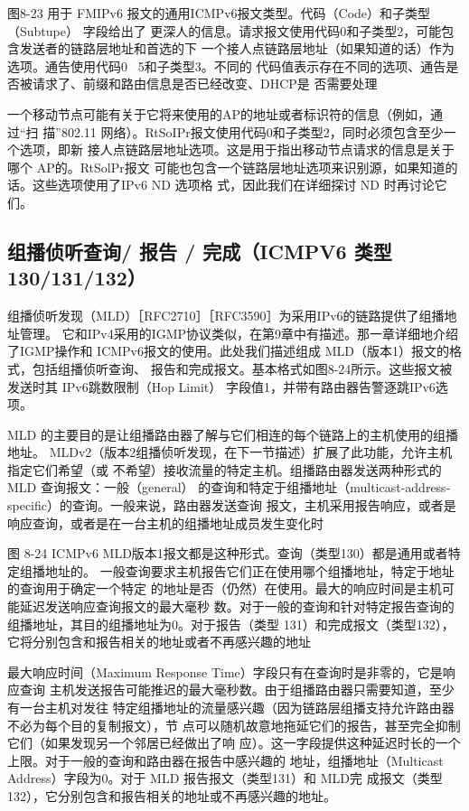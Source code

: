图8-23 用于 FMIPv6 报文的通用ICMPv6报文类型。代码（Code）和子类型（Subtupe） 字段给出了
更深人的信息。请求报文使用代码0和子类型2，可能包含发送者的链路层地址和首选的下
一个接人点链路层地址（如果知道的话）作为选项。通告使用代码0~ 5和子类型3。不同的
代码值表示存在不同的选项、通告是否被请求了、前缀和路由信息是否已经改变、DHCP是
否需要处理

一个移动节点可能有关于它将来使用的AP的地址或者标识符的信息（例如，通过“扫
描”802.11 网络）。RtSoIPr报文使用代码0和子类型2，同时必须包含至少一个选项，即新
接人点链路层地址选项。这是用于指出移动节点请求的信息是关于哪个 AP的。RtSolPr报文
可能也包含一个链路层地址选项来识别源，如果知道的话。这些选项使用了IPv6 ND 选项格
式，因此我们在详细探讨 ND 时再讨论它们。

\subsection{组播侦听查询/ 报告 / 完成（ICMPV6 类型 130/131/132）}
组播侦听发现（MLD）［RFC2710］［RFC3590］为采用IPv6的链路提供了组播地址管理。
它和IPv4采用的IGMP协议类似，在第9章中有描述。那一章详细地介绍了IGMP操作和
ICMPv6报文的使用。此处我们描述组成 MLD（版本1）报文的格式，包括组播侦听查询、
报告和完成报文。基本格式如图8-24所示。这些报文被发送时其 IPv6跳数限制（Hop Limit）
字段值1，并带有路由器告警逐跳IPv6选项。

MLD 的主要目的是让组播路由器了解与它们相连的每个链路上的主机使用的组播地址。
MLDv2（版本2组播侦听发现，在下一节描述）扩展了此功能，允许主机指定它们希望（或
不希望）接收流量的特定主机。组播路由器发送两种形式的 MLD 查询报文：一般（general）
的查询和特定于组播地址（multicast-address-specific）的查询。一般来说，路由器发送查询
报文，主机采用报告响应，或者是响应查询，或者是在一台主机的组播地址成员发生变化时

图 8-24 ICMPv6 MLD版本1报文都是这种形式。查询（类型130）都是通用或者特定组播地址的。
一般查询要求主机报告它们正在使用哪个组播地址，特定于地址的查询用于确定一个特定
的地址是否（仍然）在使用。最大的响应时间是主机可能延迟发送响应查询报文的最大毫秒
数。对于一般的查询和针对特定报告查询的组播地址，其目的组播地址为0。对于报告（类型
131）和完成报文（类型132），它将分别包含和报告相关的地址或者不再感兴趣的地址

最大响应时间（Maximum Response Time）字段只有在查询时是非零的，它是响应查询
主机发送报告可能推迟的最大毫秒数。由于组播路由器只需要知道，至少有一台主机对发往
特定组播地址的流量感兴趣（因为链路层组播支持允许路由器不必为每个目的复制报文），节
点可以随机故意地拖延它们的报告，甚至完全抑制它们（如果发现另一个邻居已经做出了响
应）。这一字段提供这种延迟时长的一个上限。对于一般的查询和路由器在报告中感兴趣的
地址，组播地址（Multicast Address）字段为0。对于 MLD 报告报文（类型131）和 MLD完
成报文（类型132），它分别包含和报告相关的地址或不再感兴趣的地址。

